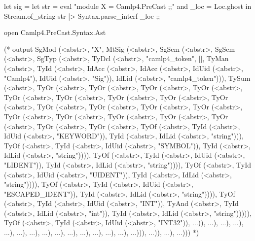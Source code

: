 \begin{ocamlcode}
let sig = 
  let str = eval "module X = Camlp4.PreCast ;;" 
  and _loc = Loc.ghost in 
  Stream.of_string str |> Syntax.parse_interf  _loc ;;

open Camlp4.PreCast.Syntax.Ast

(* output
SgMod (<abstr>, "X",
 MtSig (<abstr>,
  SgSem (<abstr>,
   SgSem (<abstr>,
    SgTyp (<abstr>,
     TyDcl (<abstr>, "camlp4_token", [],
      TyMan (<abstr>,
       TyId (<abstr>,
        IdAcc (<abstr>,
         IdAcc (<abstr>, IdUid (<abstr>, "Camlp4"), IdUid (<abstr>, "Sig")),
         IdLid (<abstr>, "camlp4_token"))),
       TySum (<abstr>,
        TyOr (<abstr>,
         TyOr (<abstr>,
          TyOr (<abstr>,
           TyOr (<abstr>,
            TyOr (<abstr>,
             TyOr (<abstr>,
              TyOr (<abstr>,
               TyOr (<abstr>,
                TyOr (<abstr>,
                 TyOr (<abstr>,
                  TyOr (<abstr>,
                   TyOr (<abstr>,
                    TyOr (<abstr>,
                     TyOr (<abstr>,
                      TyOr (<abstr>,
                       TyOr (<abstr>,
                        TyOr (<abstr>,
                         TyOr (<abstr>,
                          TyOr (<abstr>,
                           TyOr (<abstr>,
                            TyOf (<abstr>,
                             TyId (<abstr>, IdUid (<abstr>, "KEYWORD")),
                             TyId (<abstr>, IdLid (<abstr>, "string"))),
                            TyOf (<abstr>,
                             TyId (<abstr>, IdUid (<abstr>, "SYMBOL")),
                             TyId (<abstr>, IdLid (<abstr>, "string")))),
                           TyOf (<abstr>,
                            TyId (<abstr>, IdUid (<abstr>, "LIDENT")),
                            TyId (<abstr>, IdLid (<abstr>, "string")))),
                          TyOf (<abstr>,
                           TyId (<abstr>, IdUid (<abstr>, "UIDENT")),
                           TyId (<abstr>, IdLid (<abstr>, "string")))),
                         TyOf (<abstr>,
                          TyId (<abstr>, IdUid (<abstr>, "ESCAPED_IDENT")),
                          TyId (<abstr>, IdLid (<abstr>, "string")))),
                        TyOf (<abstr>,
                         TyId (<abstr>, IdUid (<abstr>, "INT")),
                         TyAnd (<abstr>,
                          TyId (<abstr>, IdLid (<abstr>, "int")),
                          TyId (<abstr>, IdLid (<abstr>, "string"))))),
                       TyOf (<abstr>,
                        TyId (<abstr>, IdUid (<abstr>, "INT32")), ...)),
                      ...),
                     ...),
                    ...),
                   ...),
                  ...),
                 ...),
                ...),
               ...),
              ...),
             ...),
            ...),
           ...),
          ...),
         ...))),
      ...)),
    ...),
   ...)))
*)
\end{ocamlcode}


